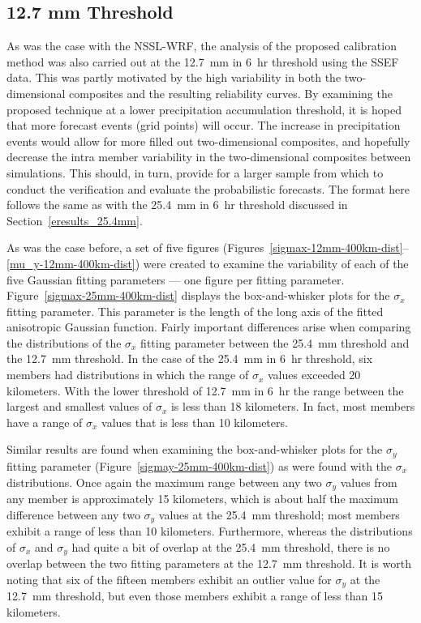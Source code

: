 \subsection{12.7 mm Threshold}
\label{eresults_12.7mm}

As was the case with the NSSL-WRF, the analysis of the proposed calibration method was also carried out at the \mbox{12.7 mm} in \mbox{6 hr} threshold using the SSEF data.
This was partly motivated by the high variability in both the two-dimensional composites and the resulting reliability curves.
By examining the proposed technique at a lower precipitation accumulation threshold, it is hoped that more forecast events (grid points) will occur.
The increase in precipitation events would allow for more filled out two-dimensional composites, and hopefully decrease the intra member variability in the two-dimensional composites between simulations.
This should, in turn, provide for a larger sample from which to conduct the verification and evaluate the probabilistic forecasts.
The format here follows the same as with the \mbox{25.4 mm} in \mbox{6 hr} threshold discussed in \mbox{Section \ref{eresults_25.4mm}}.


As was the case before, a set of five figures (\mbox{Figures \ref{sigmax-12mm-400km-dist}--\ref{mu_y-12mm-400km-dist}}) were created to examine the variability of each of the five Gaussian fitting parameters --- one figure per fitting parameter.
\mbox{Figure \ref{sigmax-25mm-400km-dist}} displays the box-and-whisker plots for the $\sigma_x$ fitting parameter.
This parameter is the length of the long axis of the fitted anisotropic Gaussian function.
Fairly important differences arise when comparing the distributions of the $\sigma_x$ fitting parameter between the \mbox{25.4 mm} threshold and the \mbox{12.7 mm} threshold.
In the case of the \mbox{25.4 mm} in \mbox{6 hr} threshold, six members had distributions in which the range of $\sigma_x$ values exceeded 20 kilometers.
With the lower threshold of \mbox{12.7 mm} in \mbox{6 hr} the range between the largest and smallest values of $\sigma_x$ is less than 18 kilometers.
In fact, most members have a range of $\sigma_x$ values that is less than 10 kilometers.


Similar results are found when examining the box-and-whisker plots for the $\sigma_y$ fitting parameter (\mbox{Figure \ref{sigmay-25mm-400km-dist}}) as were found with the $\sigma_x$ distributions.
Once again the maximum range between any two $\sigma_y$ values from any member is approximately 15 kilometers, which is about half the maximum difference between any two $\sigma_y$ values at the \mbox{25.4 mm} threshold; most members exhibit a range of less than 10 kilometers.
Furthermore, whereas the distributions of $\sigma_x$ and $\sigma_y$ had quite a bit of overlap at the \mbox{25.4 mm} threshold, there is no overlap between the two fitting parameters at the \mbox{12.7 mm} threshold.
It is worth noting that six of the fifteen members exhibit an outlier value for $\sigma_y$ at the \mbox{12.7 mm} threshold, but even those members exhibit a range of less than 15 kilometers.


